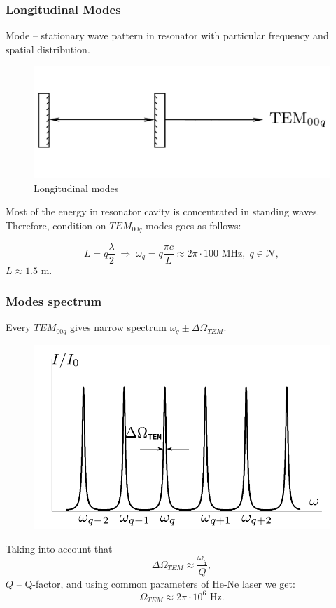 \documentclass{beamer}
\begin{document}
	\begin{frame}
		\frametitle{Longitudinal Modes}
		Mode -- stationary wave pattern in resonator with particular frequency and spatial distribution.
		
		\begin{figure}
			\includegraphics[width=0.5\linewidth]{res/tem00q.png}
			\caption{Longitudinal modes}
		\end{figure}
		
		Most of the energy in resonator cavity is concentrated in standing waves. Therefore, condition on $TEM_{00q}$ modes goes as follows:
		
		$$ L = q \frac{\lambda}{2} \; \Rightarrow \; \omega_q = q \frac{\pi c}{L} \approx 2 \pi \cdot 100 \text{ MHz}, \; q \in \mathcal{N},$$
		$L \approx 1.5$ m.
	\end{frame}
	
	\begin{frame}
		\frametitle{Modes spectrum}
		
		Every $TEM_{00q}$ gives narrow spectrum $\omega_q \pm \Delta \Omega_{TEM}$.
		\begin{figure}
			\centering
			\includegraphics[width=0.5\linewidth]{res/tem_spectrum.png}
		\end{figure}
		
		Taking into account that
		$$\Delta \Omega_{TEM} \approx \frac{\omega_q}{Q},$$
		$Q$ -- Q-factor, and using common parameters of He-Ne laser we get:
		$$ \Omega_{TEM} \approx 2 \pi \cdot 10^6 \text{ Hz}.$$
		
	\end{frame}
	
\end{document}
